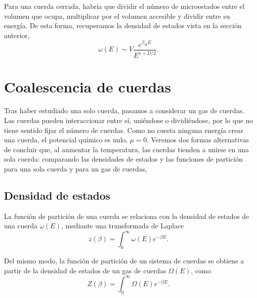 
Para una cuerda cerrada, habría que dividir el número de microestados entre el 
volumen que ocupa, multiplicar por el volumen accesible y dividir entre su energía.
De esta forma, recuperamos la densidad de estados vista en la sección anterior,
\begin{equation}
  \omega(E)\sim V \frac{e^{\beta_H E}}{E^{1+D/2}}.
\end{equation}


\section{Coalescencia de cuerdas}

Tras haber estudiado una solo cuerda, pasamos a considerar un gas de cuerdas.
Las cuerdas pueden interaccionar entre sí, uniéndose o dividiéndose, por lo que
no tiene sentido fijar el número de cuerdas. 
Como no cuesta ninguna energía crear una cuerda, el potencial químico es nulo, $\mu=0$.
Veremos dos formas alternativas de concluir que, al aumentar la temperatura, las cuerdas
tienden a unirse en una sola cuerda:
comparando las densidades de estados y las funciones de partición para una sola 
cuerda y para un gas de cuerdas, 

\subsection{Densidad de estados}

La función de partición de una cuerda se relaciona con la densidad de estados de una cuerda $\omega(E)$, mediante
una transformada de Laplace
\begin{equation}
  z(\beta) = \int_0^\infty \omega(E)e^{-\beta E}.
\end{equation}

Del mismo modo, la función de partición de un sistema de cuerdas se obtiene a partir de la
densidad de estados de un gas de cuerdas $\Omega(E)$, como
\begin{equation}
  Z(\beta) = \int_0^\infty \Omega(E)e^{-\beta E}.
  \label{eq:z1}
\end{equation}

